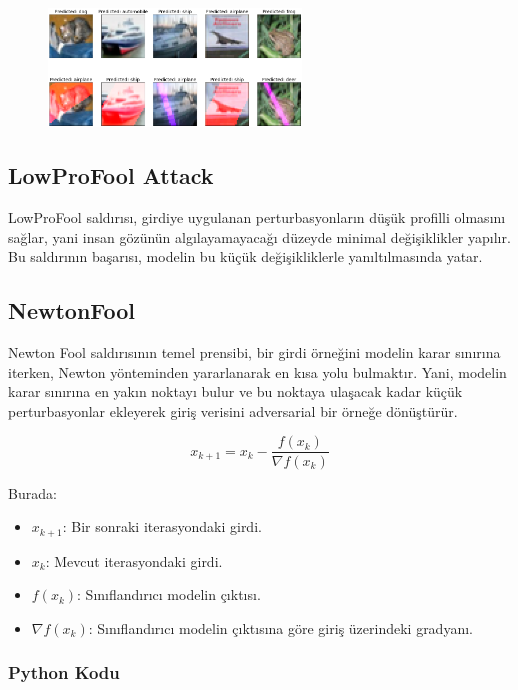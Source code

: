 \begin{figure}[h]
    \centering
    \includegraphics[width=0.6\textwidth]{images/evasion_laser_beam.png}
    \caption{}
\end{figure}

\newpage

\subsection{LowProFool Attack}

LowProFool saldırısı, girdiye uygulanan perturbasyonların düşük profilli olmasını sağlar, yani insan gözünün algılayamayacağı düzeyde minimal değişiklikler yapılır. Bu saldırının başarısı, modelin bu küçük değişikliklerle yanıltılmasında yatar.

\newpage

\subsection{NewtonFool}

Newton Fool saldırısının temel prensibi, bir girdi örneğini modelin karar sınırına iterken, Newton yönteminden yararlanarak en kısa yolu bulmaktır. Yani, modelin karar sınırına en yakın noktayı bulur ve bu noktaya ulaşacak kadar küçük perturbasyonlar ekleyerek giriş verisini adversarial bir örneğe dönüştürür.

\[ x_{k+1} = x_k - \frac{f(x_k)}{\nabla f(x_k)} \]

Burada:

\begin{itemize}
    \item $x_{k+1}$: Bir sonraki iterasyondaki girdi.
    \item $x_k$: Mevcut iterasyondaki girdi.
    \item $f(x_k)$: Sınıflandırıcı modelin çıktısı.
    \item $\nabla f(x_k)$: Sınıflandırıcı modelin çıktısına göre giriş üzerindeki gradyanı.
\end{itemize}

\subsubsection{Python Kodu}


